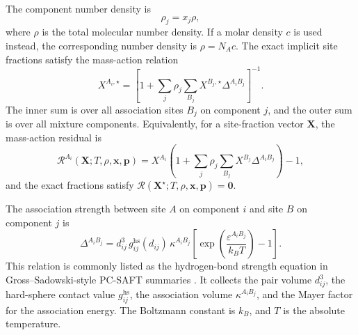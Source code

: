 \documentclass[12pt,letterpaper]{article}
\begin{document}
The component number density is
\begin{equation}
    \rho_j=x_j\rho ,
    \label{eq:component_number_density}
\end{equation}
where \(\rho\) is the total molecular number density. If a molar density \(c\)
is used instead, the corresponding number density is \(\rho=N_Ac\). The exact
implicit site fractions satisfy the mass-action relation
\begin{equation}
    X^{A_i,\star}
    =
    \left[
        1+
        \sum_j \rho_j\sum_{B_j}
        X^{B_j,\star}\Delta^{A_iB_j}
    \right]^{-1}.
    \label{eq:exact_mass_action}
\end{equation}
The inner sum is over all association sites \(B_j\) on component \(j\), and the
outer sum is over all mixture components. Equivalently, for a site-fraction
vector \(\mathbf{X}\), the mass-action residual is
\begin{equation}
    \mathcal{R}^{A_i}(\mathbf{X};T,\rho,\mathbf{x},\mathbf{p})
    =
    X^{A_i}
    \left(
        1+\sum_j\rho_j\sum_{B_j}X^{B_j}\Delta^{A_iB_j}
    \right)-1,
    \label{eq:mass_action_residual}
\end{equation}
and the exact fractions satisfy
\(\boldsymbol{\mathcal{R}}(\mathbf{X}^{\star};T,\rho,\mathbf{x},\mathbf{p})
=\mathbf{0}\).

The association strength between site \(A\) on component \(i\) and site \(B\)
on component \(j\) is
\begin{equation}
    \Delta^{A_iB_j}
    =
    d_{ij}^{3}\,
    g_{ij}^{\mathrm{hs}}(d_{ij})\,
    \kappa^{A_iB_j}
    \left[
        \exp\!\left(\frac{\varepsilon^{A_iB_j}}{k_B T}\right)-1
    \right].
    \label{eq:association_strength_literature}
\end{equation}
This relation is commonly listed as the hydrogen-bond strength equation in
Gross--Sadowski-style PC-SAFT summaries \cite{Gross2001,Gross2002,Baygi2015}.
It collects the pair volume \(d_{ij}^3\), the hard-sphere contact value
\(g_{ij}^{\mathrm{hs}}\), the association volume \(\kappa^{A_iB_j}\), and the
Mayer factor for the association energy. The Boltzmann constant is \(k_B\), and
\(T\) is the absolute temperature.
\end{document}
